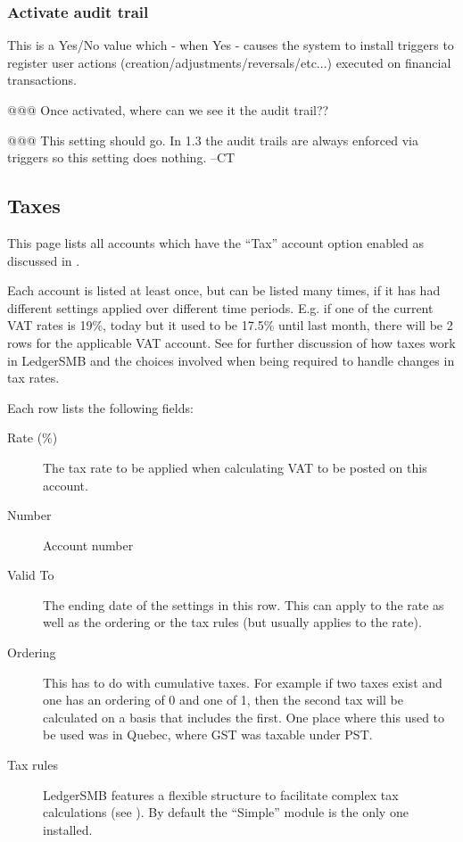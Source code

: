 \subsubsection{Activate audit trail}
\label{subsubsec-company-config-audit-control-audit-trail}

This is a Yes/No value which - when Yes - causes the system to install triggers to register
user actions (creation/adjustments/reversals/etc...) executed on financial transactions.


@@@ Once activated, where can we see it the audit trail??

@@@ This setting should go.  In 1.3 the audit trails are always enforced via
triggers so this setting does nothing.  --CT

\subsection{Taxes}
\label{subsec-company-config-taxes}


This page lists all accounts which have the ``Tax'' account option enabled as discussed in .

Each account is listed at least once, but can be listed many times, if it has had different
settings applied over different time periods. E.g. if one of the current VAT rates is 19\%,
today but it used to be 17.5\% until last month, there will be 2 rows for the applicable
VAT account. See  for further discussion of how taxes work in
LedgerSMB and the choices involved when being required to handle changes in tax rates.

Each row lists the following fields:

\begin{description}
\item [Rate (\%)] The tax rate to be applied when calculating VAT to be posted on this account.
\item [Number] Account number
\item [Valid To] The ending date of the settings in this row. This can apply to the rate as well as the ordering or the tax rules (but usually applies to the rate).
\item [Ordering] This has to do with cumulative taxes.  For example if two taxes
exist and one has an ordering of 0 and one of 1, then the second tax will be
calculated on a basis that includes the first.  One place where this used to be
used was in Quebec, where GST was taxable under PST.
\item [Tax rules] LedgerSMB features a flexible structure to facilitate complex tax
calculations (see ). By default the ``Simple'' module
is the only one installed.
\end{description}

